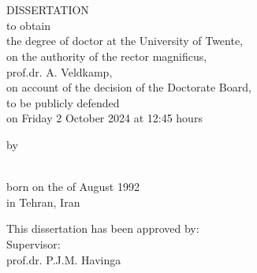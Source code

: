 \begin{titlepage}
    \ifprintcover
        \thispagestyle{empty}
        
        \cleardoublepage  
    \fi
    \thispagestyle{empty}
    \center
    \vspace*{1cm}

    \textbf{\Huge{\MakeUppercase\myTitle}}\\
    \vspace{0.5cm}
    \Large{\MakeUppercase\mySubTitle}

    \vspace{3cm}

    \textbf{\myAuthorName}
    \vfill
    
    \cleardoublepage
    
   
    \thispagestyle{empty}
    \center

    \textbf{\huge{\MakeUppercase\myTitle}}\\
    \vspace{0.5cm}
    \Large{\MakeUppercase\mySubTitle}
        
    \vfill

    \Large{DISSERTATION}\\
   
    \vfill
    \normalsize
    to obtain\\
    the degree of doctor at the University of Twente,\\
    on the authority of the rector magnificus,\\
    prof.dr. A. Veldkamp,\\
    on account of the decision of the Doctorate Board,\\
    to be publicly defended\\
    on Friday 2 October 2024 at 12:45 hours

    \vfill

    by
    
    \vfill
    
    \textbf{\large{\myAuthorName}}\\[2\baselineskip]
    
    born on the  of August 1992\\
    in Tehran, Iran


    \clearpage
    \thispagestyle{empty}
    \raggedright 
    
    This dissertation has been approved by:\\[2\baselineskip]
    
    Supervisor:\\
    prof.dr. P.J.M. Havinga 
    

\end{titlepage}
